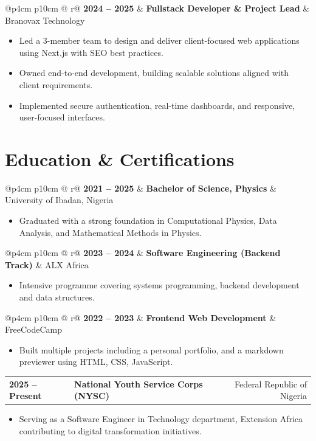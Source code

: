 \documentclass{article}
\makeatletter
\newcommand{\cventry}[3]{%
    \noindent
    \begin{tabular*}{\linewidth}{@{}p{4cm} p{10cm} @{\extracolsep{\fill}} r@{}}
        \textbf{\small #1} & \textbf{#2} & {\color{primarycolor}\small #3}
    \end{tabular*}
    \vspace{-3pt}
}
\makeatother
\begin{document}
\cventry{2024 -- 2025}{Fullstack Developer \& Project Lead}{Branovax Technology}
\vspace{-0.4cm}
\begin{itemize}
    \item Led a 3-member team to design and deliver client-focused web applications using Next.js with SEO best practices.
    \item Owned end-to-end development, building scalable solutions aligned with client requirements.
    \item Implemented secure authentication, real-time dashboards, and responsive, user-focused interfaces.
\end{itemize}

\section{Education \& Certifications}
\vspace{-0.3cm}
\cventry{2021 -- 2025}{Bachelor of Science, Physics}{University of Ibadan, Nigeria}
\vspace{-0.5cm}
\begin{itemize}
    \item Graduated with a strong foundation in Computational Physics, Data Analysis, and Mathematical Methods in Physics.
\end{itemize}
 
\vspace{1pt}
\cventry{2023 -- 2024}{Software Engineering (Backend Track)}{ALX Africa}
\vspace{-0.5cm}
\begin{itemize}
    \item Intensive programme covering systems programming, backend development and data structures.
\end{itemize}
 
\vspace{1pt}
\cventry{2022 -- 2023}{Frontend Web Development}{FreeCodeCamp}
\vspace{-0.5cm}
\begin{itemize}
    \item Built multiple projects including a personal portfolio, and a markdown previewer using HTML, CSS, JavaScript.
\end{itemize}

\vspace{1pt}
\cventry{2025 -- Present}{National Youth Service Corps (NYSC)}{Federal Republic of Nigeria}
\vspace{-0.5cm}
\begin{itemize}
    \item Serving as a Software Engineer in Technology department, Extension Africa contributing to digital transformation initiatives.
\end{itemize}
\end{document}
